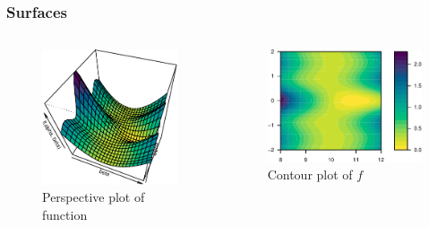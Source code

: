 \documentclass[aspectratio=1610,onlytextwidth]{beamer}
\begin{document}
\begin{frame}[c]
  \frametitle{Surfaces}
  \begin{columns}
    \begin{column}{0.4\textwidth}
      \begin{figure}[htpb]
        \centering
        \includegraphics[]{images/nonlinear-persp.pdf}
        \caption{%
          Perspective plot of function
        }
      \end{figure}
    \end{column}
    \pause
    \begin{column}{0.5\textwidth}
      \begin{figure}[htpb]
        \centering
        \includegraphics[]{images/nonlinear-contour.pdf}
        \caption{%
          Contour plot of \(f\)
        }
      \end{figure}
    \end{column}
  \end{columns}
\end{frame}
\end{document}

